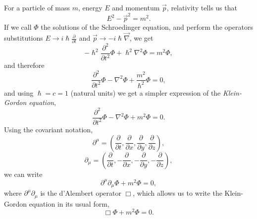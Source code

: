 For a particle of mass $m$, energy $E$ and momentum $\Vec{p}$, relativity tells us that
\begin{equation*}
    E^2 - \Vec{p}^2 = m^2.
\end{equation*}
If we call $\Phi$ the solutions of the Schroedinger equation, and perform the operators substitutions $E \rightarrow{i\hslash\frac{\partial}{\partial t}}$ and $\Vec{p} \rightarrow{-i\hslash\Vec{\nabla}}$, we get
\begin{equation*}
    -\hslash^2\frac{\partial^2}{\partial t^2}\Phi + \hslash^2\nabla^2\Phi = m^2\Phi,
\end{equation*}
and therefore
\begin{equation*}
    \frac{\partial^2}{\partial t^2}\Phi - \nabla^2\Phi+\frac{m^2}{\hslash^2}\Phi = 0,
\end{equation*}
and using $\hslash=c=1$ (natural units) we get a simpler expression of the \emph{Klein-Gordon equation},
\begin{equation*}
    \frac{\partial^2}{\partial t^2}\Phi-\nabla^2\Phi + m^2\Phi = 0.
\end{equation*}
Using the covariant notation,
\begin{equation*}
    \partial^\mu = \left(\frac{\partial}{\partial t}, \frac{\partial}{\partial x}, \frac{\partial}{\partial y}, \frac{\partial}{\partial z}\right),
\end{equation*}
\begin{equation*}
    \partial_\mu = \left(\frac{\partial}{\partial t}, -\frac{\partial}{\partial x}, -\frac{\partial}{\partial y}, -\frac{\partial}{\partial z}\right),
\end{equation*}
we can write
\begin{equation*}
    \partial^\mu\partial_\mu\Phi + m^2\Phi = 0,
\end{equation*}
where $\partial^\mu\partial_\mu$ is the d'Alembert operator $\Box$, which allows us to write the Klein-Gordon equation in its usual form,
\begin{equation*}
    \Box\Phi + m^2\Phi = 0.
\end{equation*}

